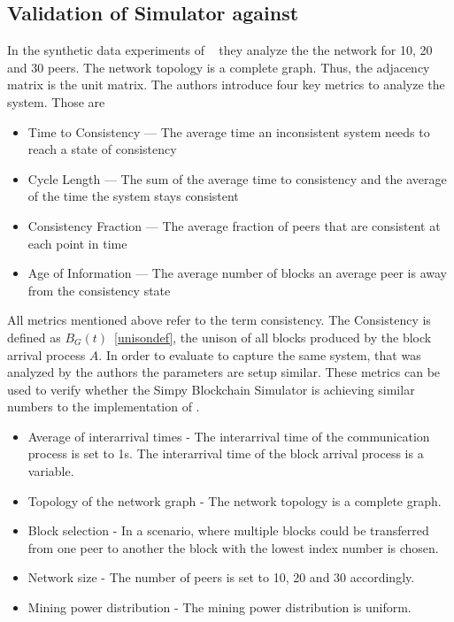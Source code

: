 \subsection{Validation of Simulator against \gopalan}\label{gopalananalysis}
In the synthetic data experiments of \gopalan~  they analyze the the network for 10, 20 and 30 peers. The network topology is a complete graph. Thus, the adjacency matrix is the unit matrix. 
The authors introduce four key metrics to analyze the system. Those are 
\begin{itemize}
\item Time to Consistency --- The average time an inconsistent system needs to reach a state of consistency
\item Cycle Length --- The sum of the average time to consistency and the average of the time the system stays consistent
\item Consistency Fraction --- The average fraction of peers that are consistent at each point in time
\item Age of Information --- The average number of blocks an average peer is away from the consistency state
\end{itemize}
All metrics mentioned above refer to the term consistency. The Consistency is defined as $B_G(t)$~\ref{unisondef}, the unison of all blocks produced by the block arrival process $A$.
In order to evaluate to capture the same system, that was analyzed by the authors the parameters are setup similar.
These metrics can be used to verify whether the Simpy Blockchain Simulator is achieving similar numbers to the implementation of \gopalan . 
\begin{itemize}
\item Average of interarrival times - The interarrival time of the communication process is set to 1s. The interarrival time of the block arrival process is a variable.
\item Topology of the network graph - The network topology is a complete graph.
\item Block selection - In a scenario, where multiple blocks could be transferred from one peer to another the block with the lowest index number is chosen.
\item Network size - The number of peers is set to 10, 20 and 30 accordingly.
\item Mining power distribution - The mining power distribution is uniform.
\end{itemize}

